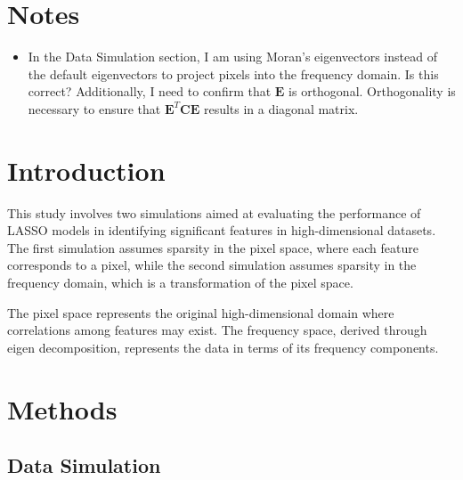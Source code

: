 \documentclass[12pt]{article}
\title{}
\author{Siyang Ren, Nichole E. Carlson, William Lippitt, Yue Wang}
\date{}
\begin{document}
\maketitle

\section*{Notes}

\begin{itemize}
  \item In the Data Simulation section, I am using Moran's eigenvectors instead of the default eigenvectors to project pixels into the frequency domain. Is this correct? Additionally, I need to confirm that \( \mathbf{E} \) is orthogonal. Orthogonality is necessary to ensure that \( \mathbf{E}^T \mathbf{C} \mathbf{E} \) results in a diagonal matrix.
\end{itemize}

\section*{Introduction}

This study involves two simulations aimed at evaluating the performance of LASSO models in identifying significant features in high-dimensional datasets. The first simulation assumes sparsity in the pixel space, where each feature corresponds to a pixel, while the second simulation assumes sparsity in the frequency domain, which is a transformation of the pixel space.

The pixel space represents the original high-dimensional domain where correlations among features may exist. The frequency space, derived through eigen decomposition, represents the data in terms of its frequency components.


\section*{Methods}

\subsection*{Data Simulation}
\end{document}
